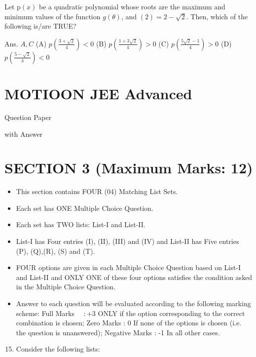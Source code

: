 \documentclass[10pt]{article}
\begin{document}
Let $\mathrm{p}(x)$ be a quadratic polynomial whose roots are the maximum and minimum values of the function $g(\theta)$, and $(2)=2-\sqrt{2}$. Then, which of the following is/are TRUE?

Ans. $A, C$
(A) $p\left(\frac{3+\sqrt{2}}{4}\right)<0$
(B) $p\left(\frac{1+3 \sqrt{2}}{4}\right)>0$
(C) $p\left(\frac{5 \sqrt{2}-1}{4}\right)>0$
(D) $p\left(\frac{5-\sqrt{2}}{4}\right)<0$

\section{MOTIOON JEE Advanced}
Question Paper

with Answer

\section{SECTION 3 (Maximum Marks: 12)}
\begin{itemize}
  \item This section contains FOUR (04) Matching List Sets.

  \item Each set has ONE Multiple Choice Question.

  \item Each set has TWO lists: List-I and List-II.

  \item List-I has Four entries (I), (II), (III) and (IV) and List-II has Five entries (P), (Q),(R), (S) and (T).

  \item FOUR options are given in each Multiple Choice Question based on List-I and List-II and ONLY ONE of these four options satisfies the condition asked in the Multiple Choice Question.

  \item Answer to each question will be evaluated according to the following marking scheme: Full Marks $\quad:+3$ ONLY if the option corresponding to the correct combination is chosen; Zero Marks : 0 If none of the options is chosen (i.e. the question is unanswered); Negative Marks : -1 In all other cases.

\end{itemize}

\begin{enumerate}
  \setcounter{enumi}{14}
  \item Consider the following lists:
\end{enumerate}
\end{document}
